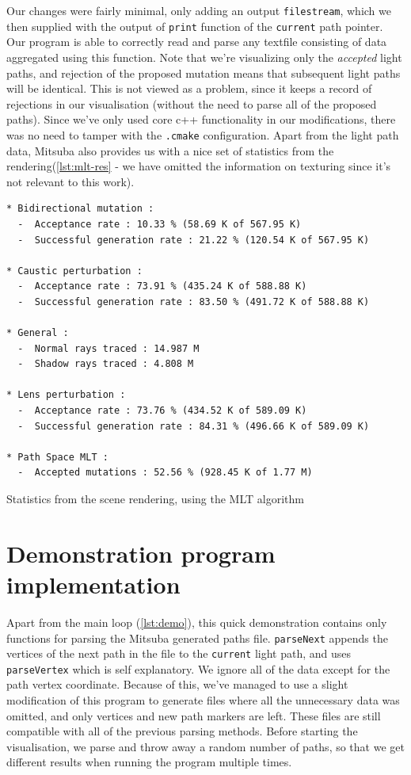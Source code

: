 Our changes were fairly minimal, only adding an output \texttt{filestream}, which we then supplied with the output of \texttt{print} function of the \texttt{current} path pointer. Our program is able to correctly read and parse any textfile consisting of data aggregated using this function. Note that we're visualizing only the \emph{accepted} light paths, and rejection of the proposed mutation means that subsequent light paths will be identical. This is not viewed as a problem, since it keeps a record of rejections in our visualisation (without the need to parse all of the proposed paths). Since we've only used core c++ functionality in our modifications, there was no need to tamper with the \texttt{.cmake} configuration. Apart from the light path data, Mitsuba also provides us with a nice set of statistics from the rendering(\ref{lst:mlt-res} - we have omitted the information on texturing since it's not relevant to this work).

\begin{listing}
\begin{verbatim}
* Bidirectional mutation :
  -  Acceptance rate : 10.33 % (58.69 K of 567.95 K)
  -  Successful generation rate : 21.22 % (120.54 K of 567.95 K)

* Caustic perturbation :
  -  Acceptance rate : 73.91 % (435.24 K of 588.88 K)
  -  Successful generation rate : 83.50 % (491.72 K of 588.88 K)

* General :
  -  Normal rays traced : 14.987 M
  -  Shadow rays traced : 4.808 M

* Lens perturbation :
  -  Acceptance rate : 73.76 % (434.52 K of 589.09 K)
  -  Successful generation rate : 84.31 % (496.66 K of 589.09 K)

* Path Space MLT :
  -  Accepted mutations : 52.56 % (928.45 K of 1.77 M)
\end{verbatim}
\caption{Statistics from the scene rendering, using the MLT algorithm}
\label{lst:mlt-res}
\end{listing}

\section{Demonstration program implementation}

Apart from the main loop (\ref{lst:demo}), this quick demonstration contains only functions for parsing the Mitsuba generated paths file. \texttt{parseNext} appends the vertices of the next path in the file to the \texttt{current} light path, and uses \texttt{parseVertex} which is self explanatory. We ignore all of the data except for the path vertex coordinate. Because of this, we've managed to use a slight modification of this program to generate files where all the unnecessary data was omitted, and only vertices and new path markers are left. These files are still compatible with all of the previous parsing methods. Before starting the visualisation, we parse and throw away a random number of paths, so that we get different results when running the program multiple times.

